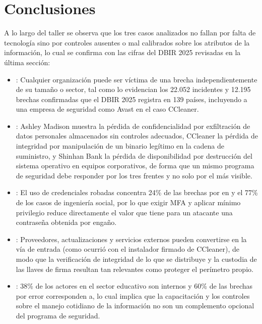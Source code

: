 \section*{Conclusiones}

A lo largo del taller se observa que los tres casos analizados no fallan por falta de
tecnología sino por controles ausentes o mal calibrados sobre los atributos de la información,
lo cual se confirma con las cifras del DBIR 2025 revisadas en la última sección:

\begin{itemize}
  \item {}: Cualquier organización puede ser víctima de una brecha independientemente de su tamaño o sector, tal como lo evidencian los 22.052 incidentes y 12.195 brechas confirmadas que el DBIR 2025 registra en 139 países, incluyendo a una empresa de seguridad como Avast en el caso CCleaner.
  \item {}: Ashley Madison muestra la pérdida de confidencialidad por exfiltración de datos personales almacenados sin controles adecuados, CCleaner la pérdida de integridad por manipulación de un binario legítimo en la cadena de suministro, y Shinhan Bank la pérdida de disponibilidad por destrucción del sistema operativo en equipos corporativos, de forma que un mismo programa de seguridad debe responder por los tres frentes y no solo por el más visible.
  \item {}: El uso de credenciales robadas concentra 24\% de las brechas por  en  y el 77\% de los casos de ingeniería social, por lo que exigir MFA y aplicar mínimo privilegio reduce directamente el valor que tiene para un atacante una contraseña obtenida por engaño.
  \item {}: Proveedores, actualizaciones y servicios externos pueden convertirse en la vía de entrada (como ocurrió con el instalador firmado de CCleaner), de modo que la verificación de integridad de lo que se distribuye y la custodia de las llaves de firma resultan tan relevantes como proteger el perímetro propio.
  \item {}: 38\% de los actores en el sector educativo son internos y 60\% de las brechas por error corresponden a, lo cual implica que la capacitación y los controles sobre el manejo cotidiano de la información no son un complemento opcional del programa de seguridad.

\end{itemize}
